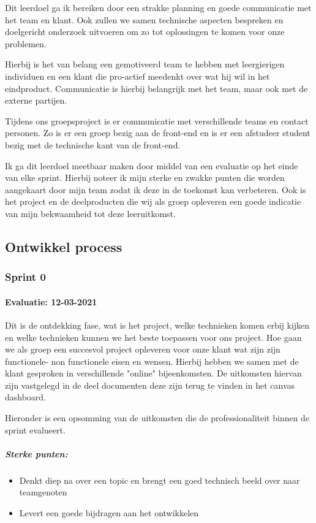 Dit leerdoel ga ik bereiken door een strakke planning en goede communicatie met het team en klant.
Ook zullen we samen technische aspecten bespreken en doelgericht onderzoek uitvoeren om zo tot oplossingen te komen
voor onze problemen.


Hierbij is het van belang een gemotiveerd team te hebben met leergierigen individuen en een klant die pro-actief
meedenkt over wat hij wil in het eindproduct.
Communicatie is hierbij belangrijk met het team, maar ook met de externe partijen.

Tijdens ons groepsproject is er communicatie met verschillende teams en contact personen.
Zo is er een groep bezig aan de front-end en is er een afstudeer student bezig met de technische kant van de front-end.


Ik ga dit leerdoel meetbaar maken door middel van een evaluatie op het einde van elke sprint.
Hierbij noteer ik mijn sterke en zwakke punten die worden aangekaart door mijn team zodat ik deze in de toekomst kan verbeteren.
Ook is het project en de deelproducten die wij als groep opleveren een goede indicatie van mijn bekwaamheid tot deze leeruitkomst.

\newpage

\bigskip
\subsection{Ontwikkel process}
\subsubsection{Sprint 0}
\paragraph{Evaluatie: 12-03-2021}
Dit is de ontdekking fase, wat is het project, welke technieken komen erbij kijken
en welke technieken kunnen we het beste toepassen voor ons project.
Hoe gaan we als groep een succesvol project opleveren voor onze klant wat zijn zijn functionele- non functionele eisen en wensen.
Hierbij hebben we samen met de klant gesproken in verschillende "online" bijeenkomsten.
De uitkomsten hiervan zijn vastgelegd in de deel documenten deze zijn terug te vinden in het canvas dashboard.


Hieronder is een opsomming van de uitkomsten die de professionaliteit binnen de sprint evalueert.
\subparagraph{Sterke punten:}
\begin{itemize}
	\setlength{\itemsep}{0pt}%
	\setlength{\parskip}{0pt}%
	\item Denkt diep na over een topic en brengt een goed technisch beeld over naar teamgenoten
	\item Levert een goede bijdragen aan het ontwikkelen
\end{itemize}

